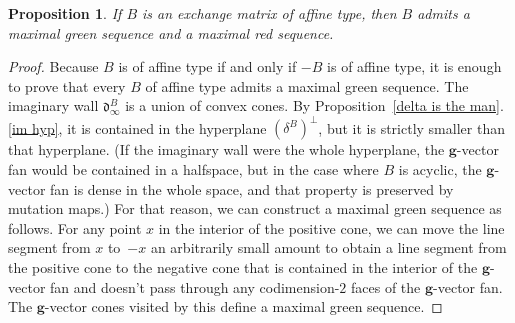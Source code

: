 \documentclass[10pt]{article}
\newtheorem{proposition}{Proposition}[section]
\theoremstyle{definition}
\theoremstyle{remark}
\numberwithin{equation}{section}
\newcommand{\0}{{\mathbf{0}}}
\newcommand{\g}{\mathbf{g}}
\renewcommand{\d}{{\mathfrak d}}
\begin{document}
\begin{proposition}\label{aff red}
If $B$ is an exchange matrix of affine type, then $B$ admits a maximal green sequence and a maximal red sequence.
\end{proposition}
\begin{proof}  
Because $B$ is of affine type if and only if $-B$ is of affine type, it is enough to prove that every $B$ of affine type admits a maximal green sequence.
The imaginary wall $\d^B_\infty$ is a union of convex cones.
By Proposition~\ref{delta is the man}.\ref{im hyp}, it is contained in the hyperplane $(\delta^B)^\perp$, but it is strictly smaller than that hyperplane.
(If the imaginary wall were the whole hyperplane, the $\g$-vector fan would be contained in a halfspace, but in the case where $B$ is acyclic, the $\g$-vector fan is dense in the whole space, and that property is preserved by mutation maps.) 
For that reason, we can construct a maximal green sequence as follows.
For any point $x$ in the interior of the positive cone, we can move the line segment from $x$ to~$-x$ an arbitrarily small amount to obtain a line segment from the positive cone to the negative cone that is contained in the interior of the $\g$-vector fan and doesn't pass through any codimension-$2$ faces of the $\g$-vector fan.
The $\g$-vector cones visited by this define a maximal green sequence.
\end{proof}
\end{document}
